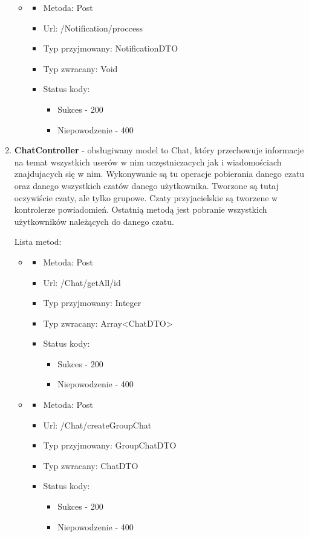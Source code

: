 \documentclass[12pt,a4paper]{article}
\begin{document}
\begin{enumerate}
\begin{itemize}
		\item 
		\begin{itemize}
			\item Metoda: Post
			\item Url: /Notification/proccess
			\item Typ przyjmowany: NotificationDTO
			\item Typ zwracany: Void
			\item Status kody: 
			\begin{itemize}
				\item Sukces - 200
				\item Niepowodzenie - 400
			\end{itemize}
		\end{itemize}

	\end{itemize}

\item \textbf{ChatController} - obsługiwany model to Chat, który przechowuje informacje na temat wszystkich userów w nim uczęstniczacych jak i wiadomościach znajdujacych się w nim. Wykonywanie są tu operacje pobierania danego czatu oraz danego wszystkich czatów danego użytkownika. Tworzone są tutaj oczywiście czaty, ale tylko grupowe. Czaty przyjacielskie są tworzene w kontrolerze powiadomień. Ostatnią metodą jest pobranie wszystkich użytkowników należących do danego czatu.

Lista metod:
\begin{itemize}
	
	\item 
	\begin{itemize}
		\item Metoda: Post
		\item Url: /Chat/getAll/{id}
		\item Typ przyjmowany: Integer
		\item Typ zwracany: Array<ChatDTO>
		\item Status kody: 
		\begin{itemize}
			\item Sukces - 200
			\item Niepowodzenie - 400
		\end{itemize}
	\end{itemize}

	\item 
	\begin{itemize}
		\item Metoda: Post
		\item Url: /Chat/createGroupChat
		\item Typ przyjmowany: GroupChatDTO
		\item Typ zwracany: ChatDTO
		\item Status kody: 
		\begin{itemize}
			\item Sukces - 200
			\item Niepowodzenie - 400
		\end{itemize}
	\end{itemize}


\end{itemize}
\end{enumerate}
\end{document}
